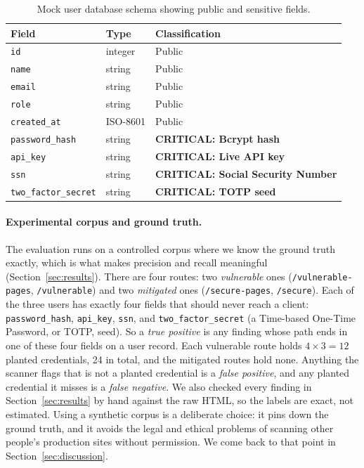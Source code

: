 \documentclass[runningheads]{llncs}
\begin{document}
\begin{table}[tbp]
  \caption{Mock user database schema showing public and sensitive fields.}
  \label{tab:schema}
  \centering
  \begin{tabular}{lll}
    \toprule
    \textbf{Field} & \textbf{Type} & \textbf{Classification} \\
    \midrule
    \texttt{id}               & integer  & Public \\
    \texttt{name}             & string   & Public \\
    \texttt{email}            & string   & Public \\
    \texttt{role}             & string   & Public \\
    \texttt{created\_at}      & ISO-8601 & Public \\
    \midrule
    \texttt{password\_hash}   & string   & \textbf{CRITICAL: Bcrypt hash} \\
    \texttt{api\_key}         & string   & \textbf{CRITICAL: Live API key} \\
    \texttt{ssn}              & string   & \textbf{CRITICAL: Social Security Number} \\
    \texttt{two\_factor\_secret} & string & \textbf{CRITICAL: TOTP seed} \\
    \bottomrule
  \end{tabular}
\end{table}

\paragraph{Experimental corpus and ground truth.}
The evaluation runs on a controlled corpus where we know the ground truth
exactly, which is what makes precision and recall meaningful
(Section~\ref{sec:results}).  There are four routes: two
\emph{vulnerable} ones (\texttt{/vulnerable-pages}, \texttt{/vulnerable})
and two \emph{mitigated} ones (\texttt{/secure-pages}, \texttt{/secure}).
Each of the three users has exactly four fields that should never reach a
client: \texttt{password\_hash}, \texttt{api\_key}, \texttt{ssn}, and
\texttt{two\_factor\_secret} (a Time-based One-Time Password, or TOTP,
seed).  So a \emph{true positive} is any finding whose path ends in one of
these four fields on a user record.  Each vulnerable route holds
$4 \times 3 = 12$ planted credentials, 24 in total, and the mitigated
routes hold none.  Anything the scanner flags that is not a planted
credential is a \emph{false positive}, and any planted credential it
misses is a \emph{false negative}.  We also checked every finding in
Section~\ref{sec:results} by hand against the raw HTML, so the labels are
exact, not estimated.  Using a synthetic corpus is a deliberate choice: it
pins down the ground truth, and it avoids the legal and ethical problems of
scanning other people's production sites without permission.  We come back
to that point in Section~\ref{sec:discussion}.
\end{document}

